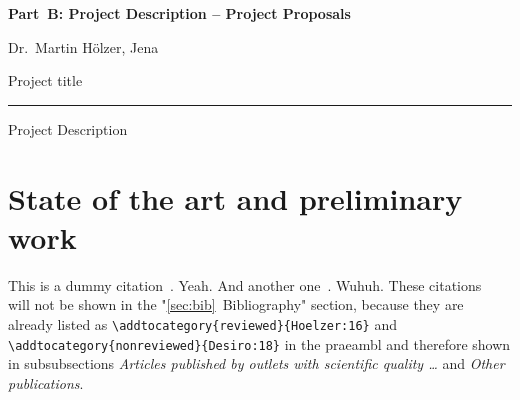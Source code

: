 \documentclass{scrartcl}
\newcommand{\applicants}{Dr.\ Martin H\"olzer, Jena}
\newcommand{\project}{Project title}
\begin{document}
\pagestyle{empty}
\setcounter{page}{0}



\cleardoublepage
\pagestyle{plain}


{\raggedright{} \normalsize \bfseries 
	Part~B: Project Description -- Project Proposals \par
	\applicants{} \par
	\project{} \par
	\rule{\textwidth}{0.5pt} \par
	Project Description
}

\section{State of the art and preliminary work}
\label{sec:work-report}

This is a dummy citation~\cite{Hoelzer:17}. Yeah. And another
one~\cite{Gerst:18}. Wuhuh. These citations~\cite{Hoelzer:16, Desiro:18} will
not be shown in the  "\ref{sec:bib}~Bibliography" section, because they are
already listed as \verb=\addtocategory{reviewed}{Hoelzer:16}= and
\verb=\addtocategory{nonreviewed}{Desiro:18}= in the praeambl and therefore
shown in subsubsections \emph{Articles published by outlets with scientific
quality \dots} and \emph{Other publications}. 
\end{document}
